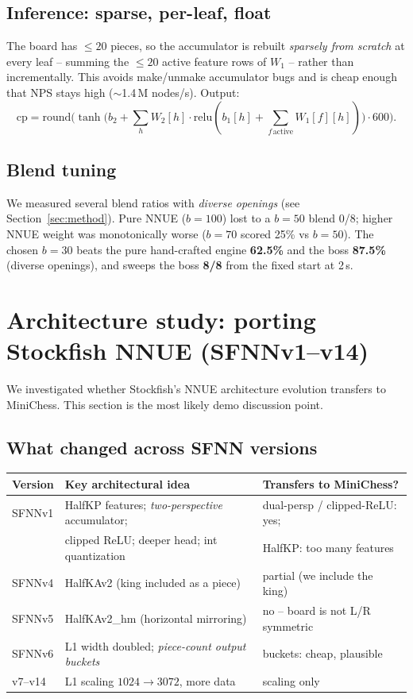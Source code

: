 \documentclass[11pt]{article}
\begin{document}
\subsection{Inference: sparse, per-leaf, float}
The board has $\le 20$ pieces, so the accumulator is rebuilt \emph{sparsely from
scratch} at every leaf -- summing the $\le 20$ active feature rows of $W_1$ --
rather than incrementally. This avoids make/unmake accumulator bugs and is cheap
enough that NPS stays high ($\sim$1.4\,M nodes/s). Output:
\begin{equation}
\text{cp} = \mathrm{round}\Big(\tanh\big(b_2 + \textstyle\sum_h W_2[h]\cdot\mathrm{relu}(b_1[h]+\!\!\sum_{f\,\text{active}}\!\!W_1[f][h])\big)\cdot 600\Big).
\end{equation}

\subsection{Blend tuning}\label{sec:blend}
We measured several blend ratios with \emph{diverse openings} (see
Section~\ref{sec:method}). Pure NNUE ($b{=}100$) lost to a $b{=}50$ blend
$0$/$8$; higher NNUE weight was monotonically worse ($b{=}70$ scored 25\% vs
$b{=}50$). The chosen $b{=}30$ beats the pure hand-crafted engine
\textbf{62.5\%} and the boss \textbf{87.5\%} (diverse openings), and sweeps the
boss \textbf{8/8} from the fixed start at 2\,s.

\section{Architecture study: porting Stockfish NNUE (SFNNv1--v14)}
We investigated whether Stockfish's NNUE architecture evolution transfers to
MiniChess. This section is the most likely demo discussion point.

\subsection{What changed across SFNN versions}
\begin{table}[h]\centering\small
\begin{tabular}{@{}lll@{}}
\toprule
Version & Key architectural idea & Transfers to MiniChess? \\
\midrule
SFNNv1 & HalfKP features; \emph{two-perspective} accumulator; & dual-persp / clipped-ReLU: yes; \\
       & clipped ReLU; deeper head; int quantization & HalfKP: too many features \\
SFNNv4 & HalfKAv2 (king included as a piece) & partial (we include the king) \\
SFNNv5 & HalfKAv2\_hm (horizontal mirroring) & no -- board is not L/R symmetric \\
SFNNv6 & L1 width doubled; \emph{piece-count output buckets} & buckets: cheap, plausible \\
v7--v14& L1 scaling $1024\!\to\!3072$, more data & scaling only \\
\bottomrule
\end{tabular}
\end{table}
\end{document}
